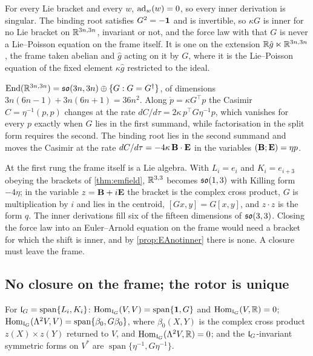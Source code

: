 \begin{proposition}
\label{prop:EAnotinner}
For every Lie bracket and every $w$, $\operatorname{ad}_w(w)=0$, so every inner derivation is singular. The binding root satisfies $G^2=-\mathbf 1$ and is
invertible, so $\kappa G$ is inner for no Lie bracket on $\mathbb{R}^{3n,3n}$, invariant or not, and the force law with that $G$ is never a
Lie--Poisson equation on the frame itself. It is one on the extension $\mathbb{R}\hat g\ltimes\mathbb{R}^{3n,3n}$, the frame taken abelian and $\hat g$ acting on
it by $G$, where it is the Lie--Poisson equation of the fixed element $\kappa\hat g$ restricted to the ideal.
\end{proposition}

\begin{theorem}
\label{thm:EAdichotomy}
$\operatorname{End}(\mathbb{R}^{3n,3n})=\mathfrak{so}(3n,3n)\oplus\{G:G=G^\dagger\}$, of dimensions $3n(6n-1)+3n(6n+1)=36n^2$. Along $\dot p=\kappa G^{\!\top}p$ the Casimir
$C=\eta^{-1}(p,p)$ changes at the rate $dC/d\tau=2\kappa\,p^{\!\top}G\eta^{-1}p$, which vanishes for every $p$ exactly when $G$ lies in the first
summand, while factorisation in the split form requires the second. The binding root lies in the second summand and moves the Casimir at the rate
$dC/d\tau=-4\kappa\,\mathbf B\cdot\mathbf E$ in the variables $(\mathbf B;\mathbf E)=\eta p$.
\end{theorem}

At the first rung the frame itself is a Lie algebra. With $L_i=e_i$ and $K_i=e_{i+3}$ obeying the brackets of \cref{thm:emfield}, $\mathbb{R}^{3,3}$
becomes $\mathfrak{so}(1,3)$ with Killing form $-4\eta$; in the variable $z=\mathbf B+i\mathbf E$ the bracket is the complex cross product, $G$ is multiplication by $i$
and lies in the centroid, $[Gx,y]=G[x,y]$, and $z\cdot z$ is the form $q$. The inner derivations fill six of the fifteen dimensions of
$\mathfrak{so}(3,3)$. Closing the force law into an Euler--Arnold equation on the frame would need a bracket for which the shift is inner, and by
\cref{prop:EAnotinner} there is none. A closure must leave the frame.

\subsection{No closure on the frame; the rotor is unique}

\begin{proposition}
\label{prop:lGhoms}
For $\mathfrak l_G=\operatorname{span}\{L_i,K_i\}$: $\operatorname{Hom}_{\mathfrak l_G}(V,V)=\operatorname{span}\{\mathbf 1,G\}$ and $\operatorname{Hom}_{\mathfrak l_G}(V,\mathbb{R})=0$;
$\operatorname{Hom}_{\mathfrak l_G}(\Lambda^2V,V)=\operatorname{span}\{\beta_0,G\beta_0\}$, where $\beta_0(X,Y)$ is the complex cross product $z(X)\times z(Y)$ returned to
$V$, and $\operatorname{Hom}_{\mathfrak l_G}(\Lambda^2V,\mathbb{R})=0$; and the $\mathfrak l_G$-invariant symmetric forms on $V^*$ are $\operatorname{span}\{\eta^{-1},G\eta^{-1}\}$.
\end{proposition}

